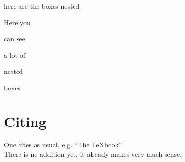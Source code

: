 \documentclass[twocolumn]{article}
\begin{document}
here are the boxes nested
\begin{mainbox}{Here you}
    \begin{ff}{can see}
        \begin{aufgabe}{a lot of}
            \begin{subbox}{nested}
                \begin{subsubbox}
                    boxes
                \end{subsubbox}
            \end{subbox}
        \end{aufgabe}
    \end{ff}
\end{mainbox}



\section{Citing}
One cites as usual, e.g. ``The \TeX{}book''~\cite{knuth1986texbook}\\
There is no addition yet, it already makes very much sense.



\vfill
\printbibliography
\end{document}
